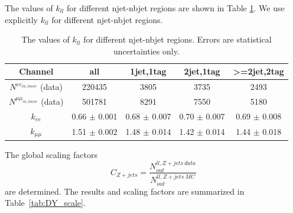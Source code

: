 The values of $k_{ll}$ for different njet-nbjet regions are shown in Table \ref{tab:kll}. We use explicitly $k_{ll}$ for different njet-nbjet regions.
\begin{table}[ht]
\centering
\begin{tabular}{|c|c|c|c|c|}
\hline
Channel                                 & all                                       & 1jet,1tag                 & 2jet,1tag             & \textgreater=2jet,2tag \\ \hline
$N^{ee_{in, loose}}$ (data)             & 220435                                    & 3805                      & 3735                  & 2493                   \\ \hline
$N^{\mu\mu_{in, loose}}$ (data)         & 501781                                    & 8291                      & 7550                  & 5180                  \\ \hline
$k_{ee}$                                & 0.66 $\pm$ 0.001                          & 0.68 $\pm$ 0.007          & 0.70 $\pm$ 0.007      & 0.69 $\pm$ 0.008         \\ \hline
$k_{\mu\mu}$                            & 1.51 $\pm$ 0.002                          & 1.48 $\pm$ 0.014          & 1.42 $\pm$ 0.014      & 1.44 $\pm$ 0.018         \\ \hline
\end{tabular}
\caption{The values of $k_{ll}$ for different njet-nbjet regions. Errors are statistical uncertainties only.}
\label{tab:kll}
\end{table}




The global scaling factors $${C}_{Z+jets}=\frac{N^{ll, Z+jets~data}_{out}}{N^{ll,Z+jets~MC}_{out}}$$ are determined.
The results and scaling factors are summarized in Table~\ref{tab:DY_scale}.


